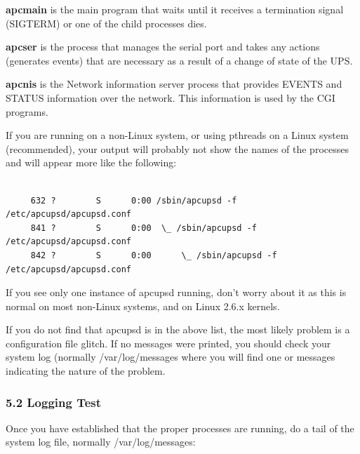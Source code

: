 {\begin{description}

\item {\bf apcmain}
is the main program that waits until it receives a termination signal
(SIGTERM) or one of the child processes dies.  

\item {\bf apcser}
is the process that manages the serial port and takes any actions (generates
events) that are necessary as a result of a change of state of the UPS.  

\item {\bf apcnis}
is the Network information server process that provides EVENTS and STATUS
information over the network. This information is used by the CGI programs. 
\end{description}

If you are running on a non-Linux system, or using pthreads on a Linux system
(recommended), your output will probably not show the names of the processes
and will appear more like the following: 

\footnotesize
\begin{verbatim}
     
     632 ?        S      0:00 /sbin/apcupsd -f /etc/apcupsd/apcupsd.conf
     841 ?        S      0:00  \_ /sbin/apcupsd -f /etc/apcupsd/apcupsd.conf
     842 ?        S      0:00      \_ /sbin/apcupsd -f /etc/apcupsd/apcupsd.conf
\end{verbatim}
\normalsize

If you see only one instance of apcupsd running, don't worry about it as this
is normal on most non-Linux systems, and on Linux 2.6.x kernels.  

If you do not find that apcupsd is in the above list, the most likely problem
is a configuration file glitch.  If no messages were printed, you should check
your system log (normally /var/log/messages where you will find one or
messages indicating the nature of the problem. 

\label{Logging-Test}

\subsubsection*{5.2 Logging Test}

\label{index-Testing_002c-Logging-87}
\label{index-Logging_002c-Testing-88}
Once you have established that the proper processes are running, do a tail of
the system log file, normally /var/log/messages: 

}

